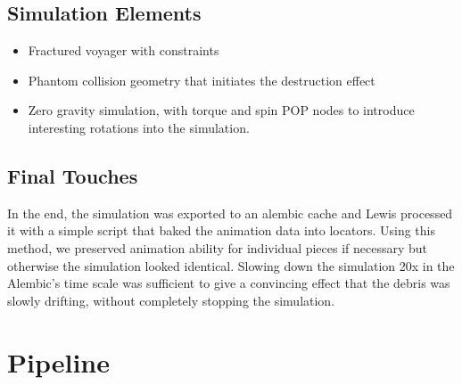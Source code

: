 \documentclass[11pt,a4paper,final,notitlepage]{report}
\begin{document}
\section{Simulation Elements}
\begin{itemize}
	\item Fractured voyager with constraints
	\item Phantom collision geometry that initiates the destruction effect
	\item Zero gravity simulation, with torque and spin POP nodes to introduce interesting rotations into the simulation.
\end{itemize}

\section{Final Touches}
In the end, the simulation was exported to an alembic cache and Lewis processed it with a simple script that baked the animation data into locators. Using this method, we preserved animation ability for individual pieces if necessary but otherwise the simulation looked identical. Slowing down the simulation 20x in the Alembic's time scale was sufficient to give a convincing effect that the debris was slowly drifting, without completely stopping the simulation.






\chapter{Pipeline}
\end{document}

